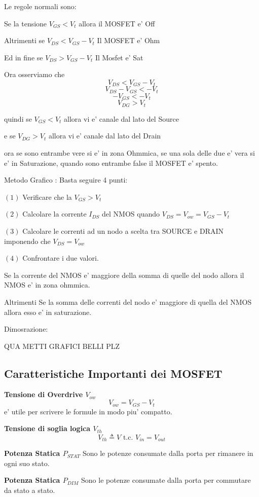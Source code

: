 \documentclass[\main/main.tex]{subfiles}
\begin{document}
Le regole normali sono:

Se la tensione $V_{GS} < V_t$ allora il MOSFET e' Off

Altrimenti se  $V_{DS} < V_{GS} - V_t$ Il MOSFET e' Ohm

Ed in fine se  $V_{DS} > V_{GS} - V_t$ Il Mosfet e' Sat

Ora osserviamo che
\[V_{DS} < V_{GS} - V_t\]
\[V_{DS} - V_{GS} <  - V_t\]
\[-V_{GS} <  - V_t\]
\[V_{DG} > V_t\]

quindi se $V_{GS} < V_t$ allora vi e' canale dal lato del Source

e se $V_{DG} > V_t$ allora vi e' canale dal lato del Drain

ora se sono entrambe vere si e' in zona Ohmmica, se una sola delle due e' vera si e' in Saturazione, quando sono entrambe false il MOSFET e' spento.


Metodo Grafico :
Basta seguire 4 punti:

$(1)$ Verificare che la $V_{GS} > V_t$

$(2)$ Calcolare la corrente $I_{DS}$ del NMOS quando $V_{DS} = V_{ow} = V_{GS} - V_{t}$

$(3)$ Calcolare le correnti ad un nodo a scelta tra SOURCE e DRAIN imponendo che $V_{DS} = V_{ow}$

$(4)$ Confrontare i due valori.

Se la corrente del NMOS e' maggiore della somma di quelle del nodo allora il NMOS e' in zona ohmmica.

Altrimenti Se la somma delle correnti del nodo e' maggiore di quella del NMOS allora esso e' in saturazione.

Dimosrazione:

QUA METTI GRAFICI BELLI PLZ

\subsection{Caratteristiche Importanti dei MOSFET}
\textbf{Tensione di Overdrive $V_{ow}$}
\[ V_{ow} = V_{GS} - V_t\]
e' utile per scrivere le formule in modo piu' compatto.

\textbf{Tensione di soglia logica $V_{th}$}
\[V_{th} \triangleq V \text{ t.c. } V_{in} = V_{out}\]

\textbf{Potenza Statica $P_{STAT}$}
Sono le potenze consumate dalla porta per rimanere in ogni suo stato.

\textbf{Potenza Statica $P_{DIM}$}
Sono le potenze consumate dalla porta per commutare da stato a stato.
\end{document}
